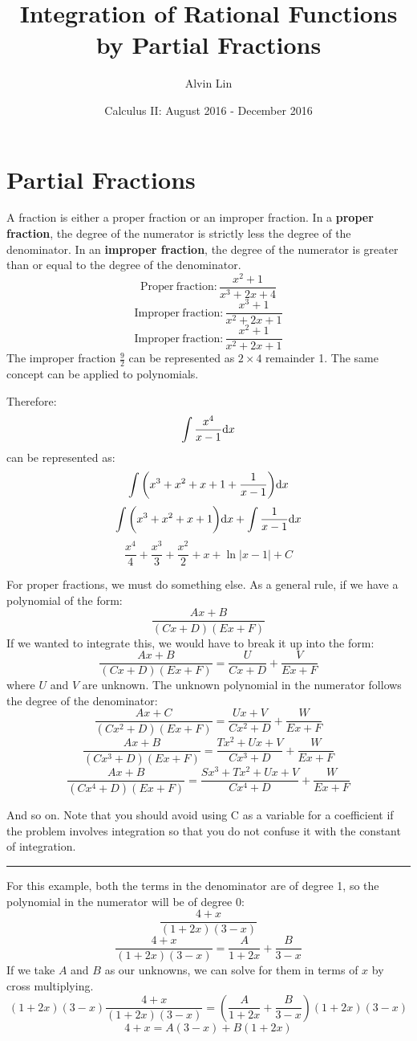 \documentclass[letterpaper, 12pt]{math}
\title{Integration of Rational Functions by Partial Fractions}
\author{Alvin Lin}
\date{Calculus II: August 2016 - December 2016}
\begin{document}
\maketitle

\section*{Partial Fractions}
A fraction is either a proper fraction or an improper fraction. In a
\textbf{proper fraction}, the degree of the numerator is strictly less the
degree of the denominator. In an \textbf{improper fraction}, the degree of
the numerator is greater than or equal to the degree of the denominator.
\[ \mathrm{Proper\ fraction}: \frac{x^{2}+1}{x^{3}+2x+4} \]
\[ \mathrm{Improper\ fraction}: \frac{x^{3}+1}{x^{2}+2x+1} \]
\[ \mathrm{Improper\ fraction}: \frac{x^{2}+1}{x^{2}+2x+1} \]
The improper fraction \( \frac{9}{2} \) can be represented as \( 2\times4 \)
remainder 1. The same concept can be applied to polynomials.
\begin{center}
\end{center}
Therefore:
\[ \int{\frac{x^{4}}{x-1}\mathrm{d}{x}} \]
can be represented as:
\[ \int{\bigg(x^{3}+x^{2}+x+1+\frac{1}{x-1}\bigg)\mathrm{d}{x}} \]
\[ \int{\bigg(x^{3}+x^{2}+x+1\bigg)\mathrm{d}{x}}+\int{\frac{1}{x-1}\mathrm{d}{x}} \]
\[ \frac{x^{4}}{4}+\frac{x^{3}}{3}+\frac{x^{2}}{2}+x+\ln|x-1|+C \]

For proper fractions, we must do something else. As a general rule, if we
have a polynomial of the form:
\[ \frac{Ax+B}{(Cx+D)(Ex+F)} \]
If we wanted to integrate this, we would have to break it up into the form:
\[ \frac{Ax+B}{(Cx+D)(Ex+F)} = \frac{U}{Cx+D}+\frac{V}{Ex+F} \]
where \( U \) and \( V \) are unknown. The unknown polynomial in the numerator
follows the degree of the denominator:
\[ \frac{Ax+C}{(Cx^{2}+D)(Ex+F)} = \frac{Ux+V}{Cx^{2}+D}+\frac{W}{Ex+F} \]
\[ \frac{Ax+B}{(Cx^{3}+D)(Ex+F)} =
   \frac{Tx^{2}+Ux+V}{Cx^{3}+D}+\frac{W}{Ex+F} \]
\[ \frac{Ax+B}{(Cx^{4}+D)(Ex+F)} =
   \frac{Sx^{3}+Tx^{2}+Ux+V}{Cx^{4}+D}+\frac{W}{Ex+F} \]
\begin{center}
  And so on. Note that you should avoid using C as a variable for a coefficient
  if the problem involves integration so that you do not confuse it with the
  constant of integration.
\end{center}

\noindent\rule{13.7cm}{0.4pt}

For this example, both the terms in the denominator are of degree 1, so
the polynomial in the numerator will be of degree 0:
\[ \frac{4+x}{(1+2x)(3-x)} \]
\[ \frac{4+x}{(1+2x)(3-x)} = \frac{A}{1+2x}+\frac{B}{3-x} \]
If we take \( A \) and \( B \) as our unknowns, we can solve for them in terms
of \( x \) by cross multiplying.
\[ (1+2x)(3-x)\frac{4+x}{(1+2x)(3-x)} =
   (\frac{A}{1+2x}+\frac{B}{3-x})(1+2x)(3-x) \]
\[ 4+x = A(3-x)+B(1+2x) \]
\end{document}
